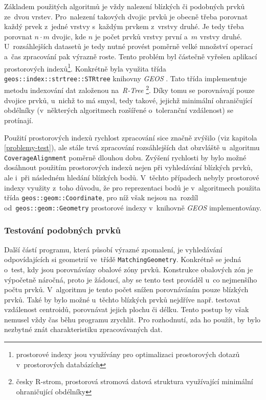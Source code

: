 Základem použitých algoritmů je vždy nalezení blízkých či podobných prvků 
ze~dvou vrstev. Pro~nalezení takových dvojic prvků je obecně třeba porovnat 
každý prvek z~jedné vrstvy s~každým prvkem z~vrstvy druhé. Je tedy třeba 
porovnat $n\cdot m$ dvojic, kde $n$ je počet prvků vrstvy první a~$m$ vrstvy 
druhé. U~rozsáhlejších datasetů je tedy nutné provést poměrně velké množství 
operací a~čas zpracování pak výrazně roste. Tento problém byl částečně vyřešen 
aplikací prostorových indexů\footnote{prostorové indexy jsou využívány pro 
optimalizaci prostorových dotazů v~prostorových databázích}. Konkrétně byla 
využita třída \texttt{geos::index::strtree::STRtree} knihovny \textit{GEOS} .
Tato třída implementuje metodu indexování dat založenou na~\textit{R-Tree}
\footnote{česky R-strom, prostorová stromová datová struktura využívající 
minimální ohraničující obdélníky}. Díky tomu se porovnávají pouze dvojice prvků, 
u~nichž to má smysl, tedy takové, jejichž minimální ohraničující obdélníky 
(v~některých algoritmech rozšířené o~toleranční vzdálenost) se protínají. 

Použití prostorových indexů rychlost zpracování sice značně zvýšilo (viz 
kapitola \ref{problemy-test}), ale stále trvá zpracování rozsáhlejších dat 
obzvláště u~algoritmu \linebreak[5] \texttt{Coverage\-Alignment} poměrně 
dlouhou dobu. Zvýšení rychlosti by bylo možné dosáhnout použitím prostorových 
indexů nejen při vyhledávání blízkých prvků, ale i~při následném hledání 
blízkých bodů. V~těchto případech nebyly prostorové indexy využity z~toho 
důvodu, že pro reprezentaci bodů je v~algoritmech použita třída 
\texttt{geos::geom::Coordinate}, pro níž však nejsou na~rozdíl 
od~\texttt{geos::geom::Geometry} prostorové indexy v~knihovně \textit{GEOS} 
implementovány.


\subsubsection{Testování podobných prvků}

Další částí programu, která působí výrazné zpomalení, je vyhledávání
odpovídajících si geometrií ve~třídě \texttt{MatchingGeometry}. Konkrétně
se jedná o~test, kdy jsou porovnávány obalové zóny prvků. Konstrukce
obalových zón je výpočetně náročná, proto je žádoucí, aby se tento test
prováděl u~co nejmenšího počtu prvků. V~algoritmu je tento počet snížen
porovnáváním pouze blízkých prvků. Také by bylo možné u~těchto 
blízkých prvků nejdříve např. testovat vzdálenost centroidů, porovnávat
jejich plochu či délku. Tento postup by však nemusel vždy čas běhu programu
zrychlit. Pro rozhodnutí, zda ho použít, by bylo nezbytné znát charakteristiku
zpracovávaných dat.


